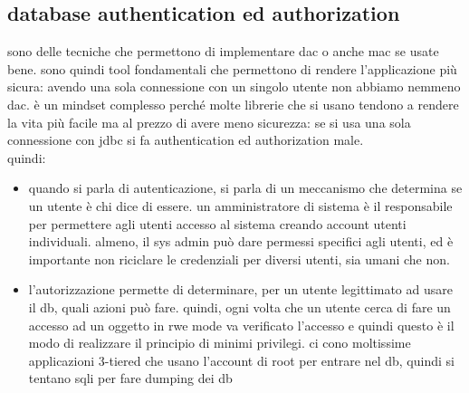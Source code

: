 \documentclass[12pt, oneside]{extbook} %
\begin{document}
\subsection{database authentication ed authorization}
sono delle tecniche che permettono di implementare dac o anche mac se usate bene. sono quindi tool fondamentali che permettono di rendere l'applicazione più sicura: avendo una sola connessione con un singolo utente non abbiamo nemmeno dac. è un mindset complesso perché molte librerie che si usano tendono a rendere la vita più facile ma al prezzo di avere meno sicurezza: se si usa una sola connessione con jdbc si fa authentication ed authorization male.\\quindi:
\begin{itemize}
	\item quando si parla di autenticazione, si parla di un meccanismo che determina se un utente è chi dice di essere. un amministratore di sistema è il responsabile per permettere agli utenti accesso al sistema creando account utenti individuali. almeno, il sys admin può dare permessi specifici agli utenti, ed è importante non riciclare le credenziali per diversi utenti, sia umani che non.
	\item l'autorizzazione permette di determinare, per un utente legittimato ad usare il db, quali azioni può fare. quindi, ogni volta che un utente cerca di fare un accesso ad un oggetto in rwe mode va verificato l'accesso e quindi questo è il modo di realizzare il principio di minimi privilegi. ci cono moltissime applicazioni 3-tiered che usano l'account di root per entrare nel db, quindi si tentano sqli per fare dumping dei db
\end{itemize}
\end{document}
